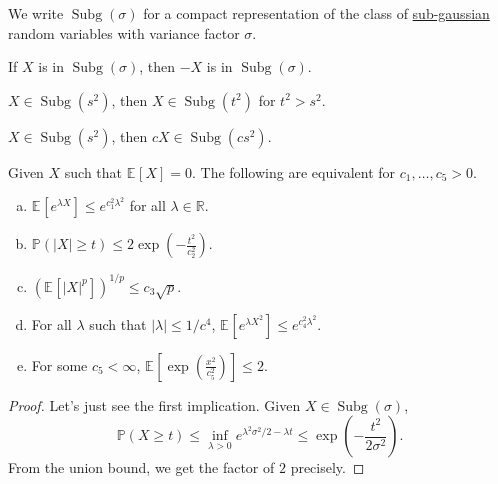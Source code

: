 \begin{notation}
	We write \(\mathop{\mathrm{Subg}}(\sigma ) \) for a compact representation of the class of \hyperref[def:sub-gaussian]{sub-gaussian} random variables with variance factor \(\sigma \).
\end{notation}

\begin{remark}
	If \(X\) is in \(\mathop{\mathrm{Subg}}(\sigma ) \), then \(-X\) is in \(\mathop{\mathrm{Subg}}(\sigma ) \).
\end{remark}

\begin{remark}
	\(X\in \mathop{\mathrm{Subg}}(s^2) \), then \(X\in \mathop{\mathrm{Subg}}(t^2) \) for \(t^2 > s^2\).
\end{remark}

\begin{remark}
	\(X\in \mathop{\mathrm{Subg}}(s^2) \), then \(cX\in \mathop{\mathrm{Subg}}(cs^2) \).
\end{remark}

\begin{lemma}
	Given \(X\) such that \(\mathbb{E}_{}\left[X \right] =0\). The following are equivalent for \(c_1, \dots , c_5 > 0\).
	\begin{enumerate}[(a)]
		\item \(\mathbb{E}_{}\left[e^{\lambda X} \right] \leq e^{c_1^2 \lambda ^2}\) for all \(\lambda \in \mathbb{R} \).
		\item \(\mathbb{P} (\vert X \vert \geq t) \leq 2 \exp \left( - \frac{t^2}{c_2^2} \right) \).
		\item \(\left( \mathbb{E}_{}\left[\vert X \vert ^p \right]  \right)^{1 / p} \leq c_3 \sqrt{p}  \).
		\item For all \(\lambda \) such that \(\vert \lambda  \vert \leq 1 / c^4 \), \(\mathbb{E}_{}\left[e^{\lambda X^2} \right] \leq e^{c_4^2 \lambda ^2} \).
		\item For some \(c_5 < \infty \), \(\mathbb{E}_{}\left[\exp \left( \frac{x^2}{c_5^2} \right)  \right] \leq 2\).
	\end{enumerate}
\end{lemma}
\begin{proof}
	Let's just see the first implication. Given \(X \in \mathop{\mathrm{Subg}}(\sigma ) \),
	\[
		\mathbb{P} (X\geq t) \leq \inf _{\lambda > 0} e^{\lambda ^2 \sigma ^2 / 2 - \lambda t} \leq \exp (-\frac{t^2}{2\sigma ^2}).
	\]
	From the union bound, we get the factor of \(2\) precisely.
\end{proof}

